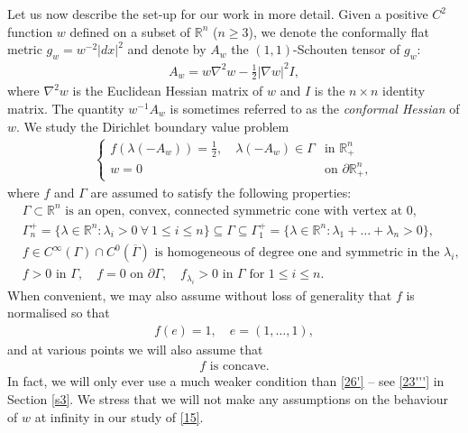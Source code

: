 \documentclass[12pt]{article}
\numberwithin{equation}{section}
\theoremstyle{plain}
\theoremstyle{definition}
\begin{document}
Let us now describe the set-up for our work in more detail. Given a positive $C^2$ function $w$ defined on a subset of $\mathbb{R}^n$ ($n\geq 3$), we denote the conformally flat metric $g_w = w^{-2}|dx|^2$ and denote by $A_w$ the $(1,1)$-Schouten tensor of $g_w$:
\begin{align}\label{305}
A_w = w\nabla^2 w - \frac{1}{2}|\nabla w|^2 I,
\end{align}
where $\nabla^2 w$ is the Euclidean Hessian matrix of $w$ and $I$ is the $n\times n$ identity matrix. The quantity $w^{-1}A_w$ is sometimes referred to as the \textit{conformal Hessian} of $w$. We study the Dirichlet boundary value problem
\begin{align}\label{15}
\begin{cases}
f(\lambda(-A_w)) = \frac{1}{2}, \quad \lambda(-A_w)\in\Gamma & \text{in }\mathbb{R}_+^n \\
w = 0 & \text{on }\partial\mathbb{R}_+^n,
\end{cases}
\end{align}
where $f$ and $\Gamma$ are assumed to satisfy the following properties: 
\begin{align}
& \Gamma\subset\mathbb{R}^n\text{ is an open, convex, connected symmetric cone with vertex at 0}, \label{21'} \\
& \Gamma_n^+ = \{\lambda\in\mathbb{R}^n: \lambda_i > 0 ~\forall ~1\leq i \leq n\} \subseteq \Gamma \subseteq \Gamma_1^+ =  \{\lambda\in\mathbb{R}^n : \lambda_1+\dots+\lambda_n > 0\}, \label{22'} \\
& f\in C^\infty(\Gamma)\cap C^0(\overline{\Gamma}) \text{ is homogeneous of degree one and symmetric in the }\lambda_i, \label{23'}  \\
& f>0 \text{ in }\Gamma, \quad f = 0 \text{ on }\partial\Gamma, \quad f_{\lambda_i} >0 \text{ in } \Gamma \text{ for }1 \leq i \leq n. \label{24'}
\end{align}
\noindent When convenient, we may also assume without loss of generality that $f$ is normalised so that 
\begin{align}\label{25'}
f(e) = 1, \quad e = (1,\dots,1),
\end{align}
and at various points we will also assume that 
\begin{align}\label{26'}
f \text{ is concave}. 
\end{align}
In fact, we will only ever use a much weaker condition than \eqref{26'} -- see \eqref{23'''} in Section \ref{s3}. We stress that we will not make any assumptions on the behaviour of $w$ at infinity in our study of \eqref{15}. \medskip 
\end{document}
